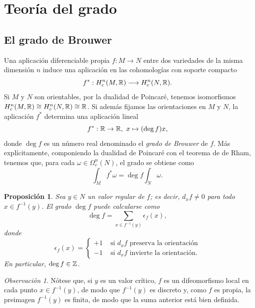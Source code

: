 \documentclass[11pt,a4paper]{amsbook}
\newtheorem{prop}[subsection]{Proposición}
\theoremstyle{remark} \newtheorem{rmk}[subsection]{Observación}
\theoremstyle{definition} \newtheorem{defn}[subsection]{Definición}
\theoremstyle{definition} \newtheorem{ex}[subsection]{Ejemplo}
\theoremstyle{definition} \newtheorem{ej}[subsection]{Ejercicio}
\begin{document}
\section{Teoría del grado}
\subsection{El grado de Brouwer} Una aplicación diferenciable propia $f:M\rightarrow N$ entre dos variedades de la misma dimensión $n$ induce una aplicación en las cohomologías con soporte compacto
\begin{equation*}
f^* : H^n_c(M,\mathbb R)\longrightarrow H^n_c(N,\mathbb R).
\end{equation*}
Si $M$ y $N$ son orientables, por la dualidad de Poincaré, tenemos isomorfismos $H^n_c(M,\mathbb R)\cong H^n_c(N,\mathbb R)\cong \mathbb R$. Si además fijamos las orientaciones en $M$ y $N$, la aplicación $f^*$ determina una aplicación lineal
\begin{equation*}
f^*:\mathbb R \rightarrow \mathbb R,\ x \mapsto (\deg f) x,
\end{equation*}
donde $\deg f$ es un número real denominado el \emph{grado de Brouwer} de $f$. Más explícitamente, componiendo la dualidad de Poincaré con el teorema de de Rham, tenemos que, para cada $\omega \in \Omega^n_c(N)$, el grado se obtiene como
\begin{equation*}
\int_M f^* \omega = \deg f \int_N \omega.
\end{equation*}

\begin{prop}
  Sea $y\in N$ un valor regular de $f$; es decir, $d_xf\neq 0$ para todo $x\in f^{-1}(y)$. El grado $\deg f$ puede calcularse como
  \begin{equation*}
\deg f = \sum_{x\in f^{-1}(y)} \epsilon_f(x),
  \end{equation*}
  donde
  \begin{equation*}
    \epsilon_f(x) =
    \begin{cases}
+1 & \text{ si $d_xf$ preserva la orientación} \\
-1 & \text{ si $d_xf$ invierte la orientación}.
\end{cases}
  \end{equation*}
En particular, $\deg f \in \mathbb Z$.
\end{prop}

\begin{rmk}
Nótese que, si $y$ es un valor crítico, $f$ es un difeomorfismo local en cada punto $x\in f^{-1}(y)$, de modo que $f^{-1}(y)$ es discreto y, como $f$ es propia, la preimagen $f^{-1}(y)$ es finita, de modo que la suma anterior está bien definida.
\end{rmk}
\end{document}
